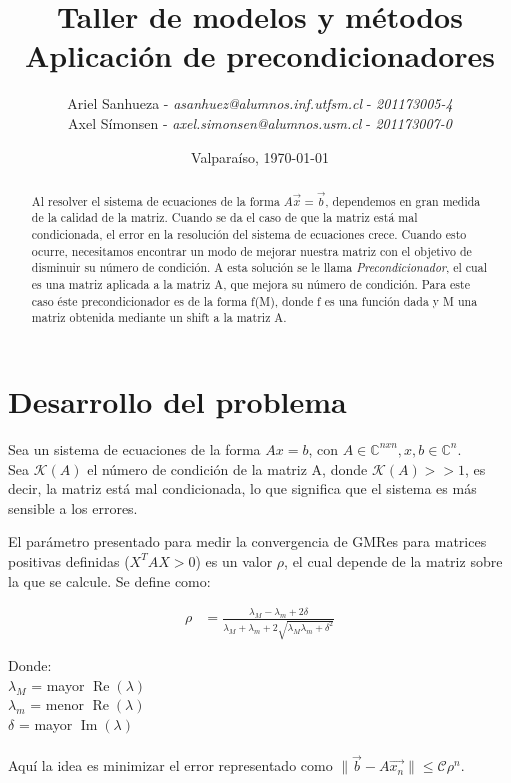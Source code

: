 \documentclass[fleqn]{article}
\title{\textbf{Taller de modelos y métodos}\\Aplicación de precondicionadores}
\author{Ariel Sanhueza - \textit{asanhuez@alumnos.inf.utfsm.cl} - \textit{201173005-4}\\
{Axel Símonsen - \textit{axel.simonsen@alumnos.usm.cl} - \textit{201173007-0}}}
\date{\vspace*{1cm} Valparaíso, \today}
\begin{document}
\maketitle

\begin{abstract}
Al resolver el sistema de ecuaciones de la forma $A\vec{x}=\vec{b}$, dependemos en gran medida de la calidad de la matriz. Cuando se da el caso de que la matriz está mal condicionada, el error en la resolución del sistema de ecuaciones crece. Cuando esto ocurre, necesitamos encontrar un modo de mejorar nuestra matriz con el objetivo de disminuir su número de condición. A esta solución se le llama \emph{Precondicionador}, el cual es una matriz aplicada a la matriz A, que mejora su número de condición. Para este caso éste precondicionador es de la forma f(M), donde f es una función dada y M una matriz obtenida mediante un shift a la matriz A.
\end{abstract}

\section{Desarrollo del problema}

Sea un sistema de ecuaciones de la forma $Ax = b$, con $A \in \mathbb{C}^{nxn}, x, b \in \mathbb{C}^{n}$.\\
Sea $\mathcal{K}(A)$ el número de condición de la matriz A, donde
$\mathcal{K}(A) >> 1$, es decir, la matriz está mal condicionada, lo que significa que el sistema es más sensible a los errores.

El parámetro presentado para medir la convergencia de GMRes para matrices positivas definidas ($X^TAX > 0$) es un valor $\rho$, el cual depende de la matriz sobre la que se calcule. Se define como:

\begin{align*}
\rho &= \frac{\lambda_M - \lambda_m + 2\delta}{\lambda_M + \lambda_m + 2\sqrt{\lambda_M \lambda_m + \delta^2}}
\end{align*}


Donde:\\
$\lambda_{M}$ = mayor $\operatorname{Re}(\lambda)$\\
$\lambda_{m}$ = menor $\operatorname{Re}(\lambda)$\\
$\delta$ = mayor $\operatorname{Im}(\lambda)$\\
\\

Aquí la idea es minimizar el error representado como
$ \|\vec{b} - A\vec{x_{n}}\| \le \mathcal{C}\rho^n$.
\end{document}
